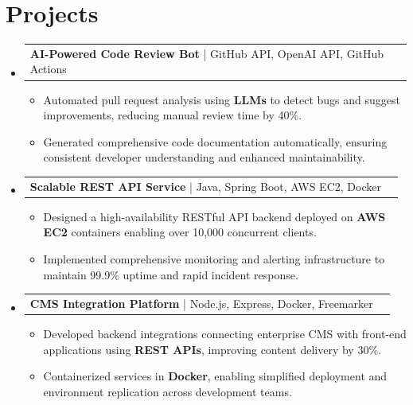 \documentclass[letterpaper,11pt]{article}
\makeatletter
\newcommand{\resumeItem}[1]{
  \item\footnotesize{
    {#1 \vspace{-2pt}}
  }
}
\newcommand{\resumeProjectHeading}[2]{
    \item
    \begin{tabular*}{1.001\textwidth}{l@{\extracolsep{\fill}}r}
      \small#1 & \textbf{\small #2}\\
    \end{tabular*}\vspace{-7pt}
}
\newcommand{\resumeSubHeadingListStart}{\begin{itemize}[leftmargin=0pt, label={}]}
\newcommand{\resumeSubHeadingListEnd}{\end{itemize}}
\newcommand{\resumeItemListStart}{\begin{itemize}[leftmargin=*]}
\newcommand{\resumeItemListEnd}{\end{itemize}\vspace{-5pt}}
\makeatother
\begin{document}
\section{Projects}
    \vspace{-5pt}
    \resumeSubHeadingListStart
      \resumeProjectHeading
          {\textbf{AI-Powered Code Review Bot} | GitHub API, OpenAI API, GitHub Actions}{}
          \resumeItemListStart
              \resumeItem{Automated pull request analysis using \textbf{LLMs} to detect bugs and suggest improvements, reducing manual review time by 40\%.}
              \resumeItem{Generated comprehensive code documentation automatically, ensuring consistent developer understanding and enhanced maintainability.}
          \resumeItemListEnd
          \vspace{-12pt}
      \resumeProjectHeading
          {\textbf{Scalable REST API Service} | Java, Spring Boot, AWS EC2, Docker}{}
          \resumeItemListStart
              \resumeItem{Designed a high-availability RESTful API backend deployed on \textbf{AWS EC2} containers enabling over 10,000 concurrent clients.}
              \resumeItem{Implemented comprehensive monitoring and alerting infrastructure to maintain 99.9\% uptime and rapid incident response.}
          \resumeItemListEnd
          \vspace{-12pt}
      \resumeProjectHeading
          {\textbf{CMS Integration Platform} | Node.js, Express, Docker, Freemarker}{}
          \resumeItemListStart
              \resumeItem{Developed backend integrations connecting enterprise CMS with front-end applications using \textbf{REST APIs}, improving content delivery by 30\%.}
              \resumeItem{Containerized services in \textbf{Docker}, enabling simplified deployment and environment replication across development teams.}
          \resumeItemListEnd 
    \resumeSubHeadingListEnd
\end{document}

